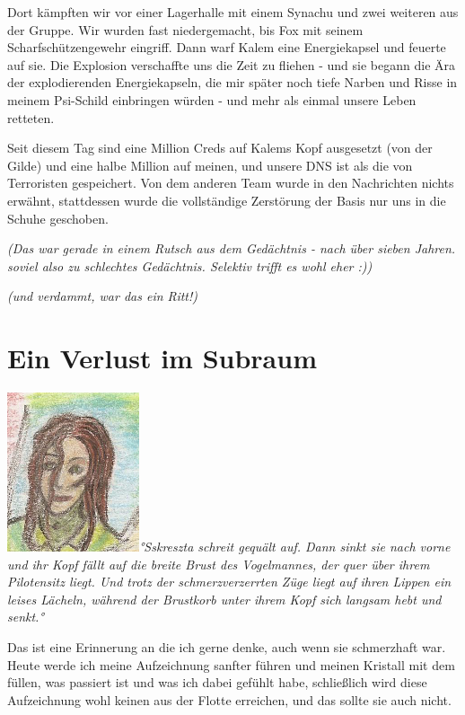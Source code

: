\documentclass[11pt]{scrartcl}
\begin{document}
Dort kämpften wir vor einer Lagerhalle mit einem Synachu und zwei
weiteren aus der Gruppe. Wir wurden fast niedergemacht, bis Fox mit
seinem Scharfschützengewehr eingriff. Dann warf Kalem eine Energiekapsel
und feuerte auf sie. Die Explosion verschaffte uns die Zeit zu fliehen -
und sie begann die Ära der explodierenden Energiekapseln, die mir später
noch tiefe Narben und Risse in meinem Psi-Schild einbringen würden - und
mehr als einmal unsere Leben retteten.

Seit diesem Tag sind eine Million Creds auf Kalems Kopf ausgesetzt (von
der Gilde) und eine halbe Million auf meinen, und unsere DNS ist als die
von Terroristen gespeichert. Von dem anderen Team wurde in den
Nachrichten nichts erwähnt, stattdessen wurde die vollständige
Zerstörung der Basis nur uns in die Schuhe geschoben.

\emph{(Das war gerade in einem Rutsch aus dem Gedächtnis - nach über
sieben Jahren. soviel also zu schlechtes Gedächtnis. Selektiv trifft es
wohl eher :))}

\emph{(und verdammt, war das ein Ritt!)}

\section{Ein Verlust im Subraum}

\emph{\includegraphics{sskreszta-portrait-alt-klein.png}°Sskreszta
schreit gequält auf. Dann sinkt sie nach vorne und ihr Kopf fällt auf
die breite Brust des Vogelmannes, der quer über ihrem Pilotensitz liegt.
Und trotz der schmerzverzerrten Züge liegt auf ihren Lippen ein leises
Lächeln, während der Brustkorb unter ihrem Kopf sich langsam hebt und
senkt.°}

Das ist eine Erinnerung an die ich gerne denke, auch wenn sie
schmerzhaft war. Heute werde ich meine Aufzeichnung sanfter führen und
meinen Kristall mit dem füllen, was passiert ist und was ich dabei
gefühlt habe, schließlich wird diese Aufzeichnung wohl keinen aus der
Flotte erreichen, und das sollte sie auch nicht.
\end{document}
